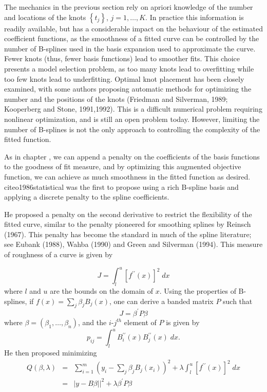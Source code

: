 \documentclass[12pt]{article}
\newcommand*\needsparaphrased{\color{red}}
\theoremstyle{definition}
\begin{document}
The mechanics in the previous section rely on apriori knowledge of the number and locations of the knots $\left\{t_j\right\}$, $j=1,\dots,K$. In practice this information is readily available, but has a considerable impact on the behaviour of the estimated coefficient functions, as the smoothness of a fitted curve can be controlled by the number of B-splines used in the basis expansion used to approximate the curve. Fewer knots (thus, fewer basis functions) lead to smoother fits. This choice presents a model selection problem, as too many knots lead to overfitting while too few knots lead to underfitting. Optimal knot placement has been closely examined, with some authors proposing automatic methods for optimizing the number and the positions of the knots (Friedman and Silverman, 1989; Kooperberg and Stone, 1991,1992). This is a difficult numerical problem requiring nonlinear optimization, and is still an open problem today. However, limiting the number of B-splines is not the only approach to controlling the complexity of the fitted function. 

As in chapter {\needsparaphrased{smoothing spline chapter}}, we can append a penalty on the coefficients of the basis functions to the goodness of fit measure, and by optimizing this augmented objective function, we can achieve as much smoothness in the fitted function as desired. cite{o1986statistical} was the first to propose using a rich B-spline basis and applying a discrete penalty to the spline coefficients. 

 He proposed a penalty on the second derivative to restrict the flexibility of the fitted curve, similar to the penalty pioneered for smoothing splines by Reinsch (1967). This penalty has become the standard in much of the spline literature; see Eubank (1988), Wahba (1990) and Green and Silverman (1994). This measure of roughness of a curve is given by 
 
 \[
 J = \int_l^u \left[ f^{\prime \prime}\left(x\right)\right]^2\;dx
 \]
 \noindent
 where $l$ and $u$ are the bounds on the domain of $x$. Using the properties of B-splines, if $f\left(x\right) = \sum_{j} \beta_j B_j\left(x\right)$, one can derive a banded matrix $P$ such that 
 \[
 J = \beta^\prime P \beta
 \] 
 \noindent
 where $\beta = \left(\beta_1,\dots, \beta_n\right)$, and the $i$-$j^{th}$ element of $P$ is given by
 \[
 p_{ij} = \int_l^u B_i^{\prime \prime} \left( x \right)B_j^{\prime \prime} \left( x \right)\;dx.
 \]
 \noindent
 He then proposed minimizing
 \begin{eqnarray*}
 Q\left(\beta, \lambda \right) &=& \sum_{i=1}^m \left(y_i - \sum_{j} \beta_j B_j\left(x_i \right)\right)^2 + \lambda \int_l^u \left[ f^{\prime \prime}\left(x\right)\right]^2\;dx\\
 &=& \vert y - B\beta \vert  \vert^2 + \lambda\beta^\prime P \beta
 \end{eqnarray*}
\end{document}
